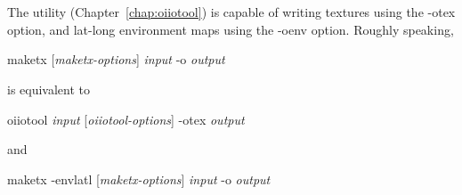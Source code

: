 \begin{comment}

\subsection{{\cf maketx} Recipes}


This section will give quick examples of common uses of {\cf maketx}.

\subsection*{Converting between file formats}

It's a snap to converting among image formats supported by \product
(i.e., for which \ImageInput and \ImageOutput plugins can be found).
The {\cf maketx} utility will simply infer the file format from the
file extension. The following example converts a PNG image to JPEG:

\begin{code}
    maketx lena.png lena.jpg
\end{code}

\end{comment}

\newpage
\section{\oiiotool}
\label{sec:oiiotooltex}

The \oiiotool utility (Chapter~\ref{chap:oiiotool}) is capable of writing
textures using the {\cf -otex} option, and lat-long environment maps using
the {\cf -oenv} option. Roughly speaking,

\medskip

\hspace{0.25in} {\cf maketx} [\emph{maketx-options}] \emph{input} {\cf -o} \emph{output}

\medskip

\noindent is equivalent to

\medskip

\hspace{0.25in} {\cf oiiotool} \emph{input} [\emph{oiiotool-options}] {\cf -otex} \emph{output}

\medskip

\noindent and

\medskip

\hspace{0.25in} {\cf maketx -envlatl} [\emph{maketx-options}] \emph{input} {\cf -o} \emph{output}


